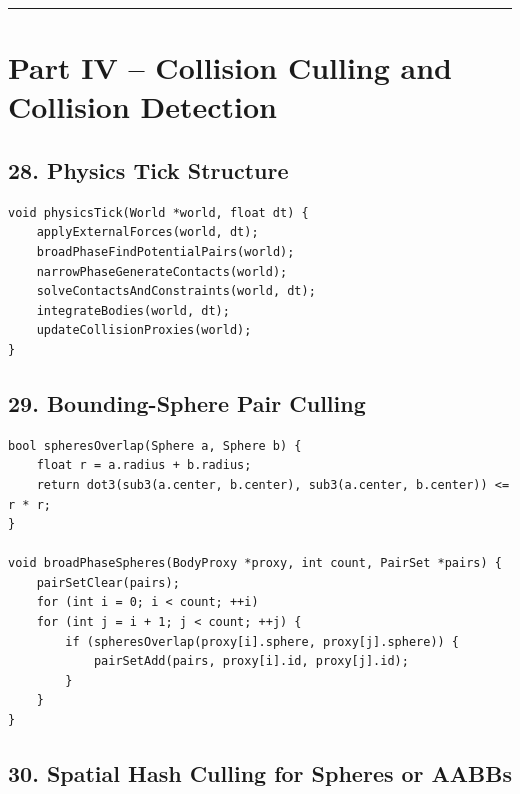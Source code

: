 \documentclass[10pt,letterpaper]{article}
\begin{document}
\medskip\hrule\medskip

\clearpage
\section*{Part IV -- Collision Culling and Collision Detection}

\subsection*{28. Physics Tick Structure}

\begin{verbatim}
void physicsTick(World *world, float dt) {
    applyExternalForces(world, dt);
    broadPhaseFindPotentialPairs(world);
    narrowPhaseGenerateContacts(world);
    solveContactsAndConstraints(world, dt);
    integrateBodies(world, dt);
    updateCollisionProxies(world);
}
\end{verbatim}

\subsection*{29. Bounding-Sphere Pair Culling}

\begin{verbatim}
bool spheresOverlap(Sphere a, Sphere b) {
    float r = a.radius + b.radius;
    return dot3(sub3(a.center, b.center), sub3(a.center, b.center)) <= r * r;
}

void broadPhaseSpheres(BodyProxy *proxy, int count, PairSet *pairs) {
    pairSetClear(pairs);
    for (int i = 0; i < count; ++i)
    for (int j = i + 1; j < count; ++j) {
        if (spheresOverlap(proxy[i].sphere, proxy[j].sphere)) {
            pairSetAdd(pairs, proxy[i].id, proxy[j].id);
        }
    }
}
\end{verbatim}

\subsection*{30. Spatial Hash Culling for Spheres or AABBs}
\end{document}
